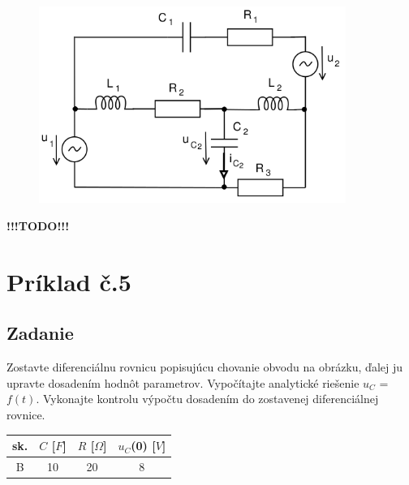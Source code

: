 \documentclass[a4paper,oneside,12pt]{article}
\begin{document}
\begin{figure}[h]
		\begin{center}
			\includegraphics[width=10cm]{circuit_4.png}
		\end{center}
\end{figure}

\begin{center}

	{\textbf{\LARGE !!!TODO!!!}}
	
\end{center}

\newpage

\maketitle
\section{Príklad č.5}
	
\maketitle
\subsection{Zadanie}
Zostavte diferenciálnu rovnicu popisujúcu chovanie obvodu na obrázku, ďalej ju
upravte dosadením hodnôt parametrov. Vypočítajte analytické riešenie $u_{C}$ = $f(t)$.
Vykonajte kontrolu výpočtu dosadením do zostavenej diferenciálnej rovnice.

\begin{table}[h]
	\begin{center}		
		\begin{tabular}{|c|c|c|c|}
				\hline
				sk. & $C$ [$F$] & $R$ [$\Omega$] &  $u_{C}$(0) [$V$] \\
				\hline
				B & 10 & 20 & 8  \\
				\hline
		\end{tabular}
	\end{center}
\end{table}
\end{document}
